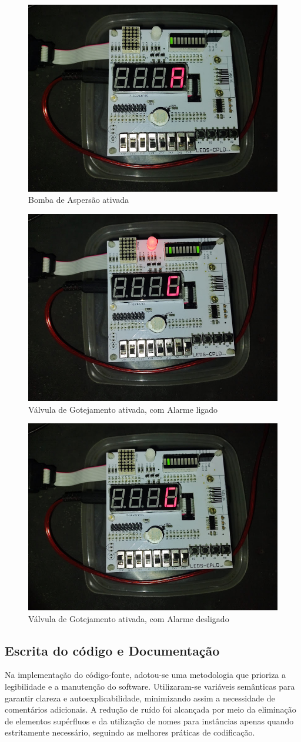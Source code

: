\documentclass[
	article,			%
	11pt,				%
	oneside,			%
	a4paper,			%
	english,			%
	brazil,				%
	sumario=tradicional
	]{abntex2}
\begin{document}
\begin{figure}[H]
    \centering
    \includegraphics[width=0.5\linewidth]{aspersao.png}
    \caption{Bomba de Aspersão ativada}
    \label{fig:asp}
\end{figure}
\begin{figure}[H]
    \centering
    \includegraphics[width=0.5\linewidth]{got-atv.png}
    \caption{Válvula de Gotejamento ativada, com Alarme ligado}
    \label{fig:got-atv}
\end{figure}
\begin{figure}[H]
    \centering
    \includegraphics[width=0.5\linewidth]{got-inatv.png}
    \caption{Válvula de Gotejamento ativada, com Alarme desligado}
    \label{fig:got-inatv}
\end{figure}

\subsection{Escrita do código e Documentação}

Na implementação do código-fonte, adotou-se uma metodologia que prioriza a legibilidade e a manutenção do software. Utilizaram-se variáveis semânticas para garantir clareza e autoexplicabilidade, minimizando assim a necessidade de comentários adicionais. A redução de ruído foi alcançada por meio da eliminação de elementos supérfluos e da utilização de nomes para instâncias apenas quando estritamente necessário, seguindo as melhores práticas de codificação.
\end{document}
